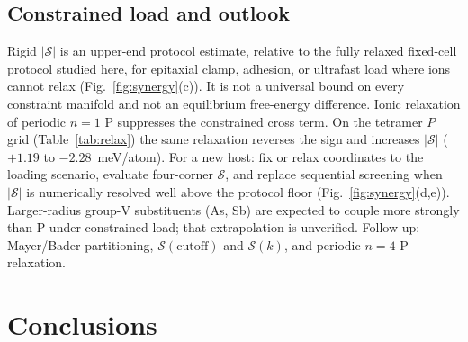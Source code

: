 \documentclass[%
 reprint,
 groupedaddress,
 amsmath,amssymb,
 aps,
 prb,
 floatfix,
]{revtex4-2}
\begin{document}
\subsection{Constrained load and outlook}
\label{sec:discussion_future}
\label{sec:constrained_loading}

Rigid $|\mathcal{S}|$ is an upper-end protocol estimate, relative to the fully relaxed fixed-cell protocol studied here, for epitaxial clamp, adhesion, or ultrafast load where ions cannot relax (Fig.~\ref{fig:synergy}(c)). It is not a universal bound on every constraint manifold and not an equilibrium free-energy difference.
Ionic relaxation of periodic $n{=}1$ P suppresses the constrained cross term.
On the tetramer $P$ grid (Table~\ref{tab:relax}) the same relaxation reverses the sign and increases $|\mathcal{S}|$ ($+1.19$ to $-2.28$~meV/atom).
For a new host: fix or relax coordinates to the loading scenario, evaluate four-corner $\mathcal{S}$, and replace sequential screening when $|\mathcal{S}|$ is numerically resolved well above the protocol floor (Fig.~\ref{fig:synergy}(d,e)).
Larger-radius group-V substituents (As, Sb) are expected to couple more strongly than P under constrained load; that extrapolation is unverified.
Follow-up: Mayer/Bader partitioning, $\mathcal{S}(\mathrm{cutoff})$ and $\mathcal{S}(k)$, and periodic $n{=}4$ P relaxation.

\section{\label{sec:conclusions}Conclusions}
\end{document}
